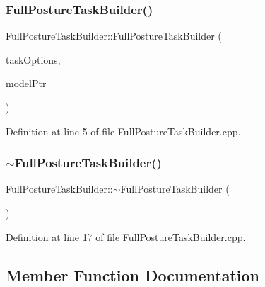 \subsubsection{\texorpdfstring{Full\+Posture\+Task\+Builder()}{FullPostureTaskBuilder()}}
{\footnotesize\ttfamily Full\+Posture\+Task\+Builder\+::\+Full\+Posture\+Task\+Builder (\begin{DoxyParamCaption}\item[{const \hyperlink{classocra_1_1TaskBuilderOptions}{Task\+Builder\+Options} \&}]{task\+Options,  }\item[{Model\+::\+Ptr}]{model\+Ptr }\end{DoxyParamCaption})}



Definition at line 5 of file Full\+Posture\+Task\+Builder.\+cpp.

\hypertarget{classocra_1_1FullPostureTaskBuilder_a4829af35d08e67294aad90e19c70c916}{}\label{classocra_1_1FullPostureTaskBuilder_a4829af35d08e67294aad90e19c70c916} 
\subsubsection{\texorpdfstring{$\sim$\+Full\+Posture\+Task\+Builder()}{~FullPostureTaskBuilder()}}
{\footnotesize\ttfamily Full\+Posture\+Task\+Builder\+::$\sim$\+Full\+Posture\+Task\+Builder (\begin{DoxyParamCaption}{ }\end{DoxyParamCaption})\hspace{0.3cm}{\ttfamily [virtual]}}



Definition at line 17 of file Full\+Posture\+Task\+Builder.\+cpp.



\subsection{Member Function Documentation}
\hypertarget{classocra_1_1FullPostureTaskBuilder_a7651ca4fd2ef7c8096a399b128981122}{}\label{classocra_1_1FullPostureTaskBuilder_a7651ca4fd2ef7c8096a399b128981122} 
